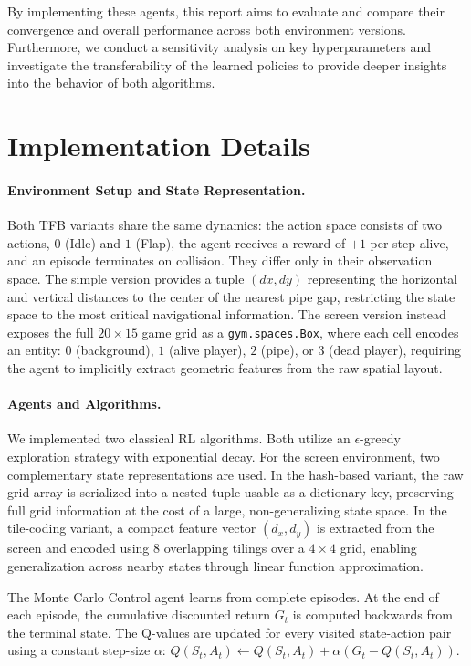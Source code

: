 \documentclass[runningheads]{llncs}
\begin{document}
By implementing these agents, this report aims to evaluate and compare their convergence and overall performance across both environment versions. Furthermore, we conduct a sensitivity analysis on key hyperparameters and investigate the transferability of the learned policies to provide deeper insights into the behavior of both algorithms.

\section{Implementation Details}
\paragraph{Environment Setup and State Representation.} Both TFB variants share the
same dynamics: the action space consists of two actions, $0$ (Idle) and $1$ (Flap),
the agent receives a reward of $+1$ per step alive, and an episode terminates on
collision. They differ only in their observation space. The simple version provides
a tuple $(dx, dy)$ representing the horizontal and vertical distances to the center
of the nearest pipe gap, restricting the state space to the most critical navigational
information. The screen version instead exposes the full $20 \times 15$ game grid as
a \texttt{gym.spaces.Box}, where each cell encodes an entity: $0$ (background),
$1$ (alive player), $2$ (pipe), or $3$ (dead player), requiring the agent to
implicitly extract geometric features from the raw spatial layout.

\paragraph{Agents and Algorithms.} We implemented two classical RL algorithms. Both utilize an $\epsilon$-greedy exploration strategy with exponential decay. For the screen environment, two complementary state representations are used. In the hash-based variant, the raw grid array is serialized into a nested tuple usable as a dictionary key, preserving full grid information at the cost of a large, non-generalizing state space. In the tile-coding variant, a compact feature vector $(d_x, d_y)$ is extracted from the screen and encoded using $8$ overlapping tilings over a $4\times4$ grid, enabling generalization across nearby states through linear function approximation.

The Monte Carlo Control agent learns from complete episodes. At the end of each episode, the cumulative discounted return $G_t$ is computed backwards from the terminal state. The Q-values are updated for every visited state-action pair using a constant step-size $\alpha$:
$Q(S_t, A_t) \leftarrow Q(S_t, A_t) + \alpha (G_t - Q(S_t, A_t))$. 
\end{document}
